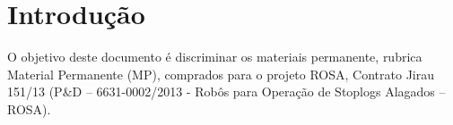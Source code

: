

\section{Introdução}
\label{introducao}

O objetivo deste documento é discriminar os materiais permanente, rubrica Material Permanente (MP), comprados para o projeto ROSA, Contrato Jirau 151/13 (P\&D – 6631-0002/2013 - Robôs para Operação de Stoplogs Alagados – ROSA).  